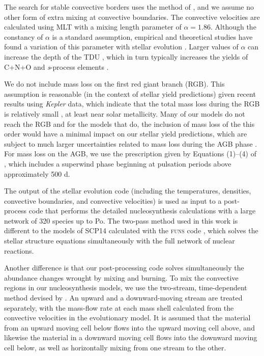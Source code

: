 The search for stable convective borders uses the method of \citet{Lattanzio:1986cz} \citep[see also][]{Frost:1996fu}, and we assume no other form of extra mixing at convective boundaries. The convective velocities are calculated using MLT with a mixing length parameter of $\alpha=1.86$. Although the constancy of $\alpha$ is a standard assumption, empirical and theoretical studies have found a variation of this parameter with stellar evolution \citep{Lebzelter:2007ho,Magic:2014vb}. Larger values of $\alpha$ can increase the depth of the TDU \citep[e.g.,][]{Boothroyd:1988jl}, which in turn typically increases the yields of C+N+O and \textit{s}-process elements \citep{Cristallo:2009kn,Cristallo:2011fz}.

We do not include mass loss on the first red giant branch (RGB). This assumption is reasonable (in the context of stellar yield predictions) given recent results using \textit{Kepler} data, which indicate that the total mass loss during the RGB is relatively small \citep[$\Delta M=0.09\pm 0.03\pm 0.04\ \Msun$;][]{Miglio:2012dm}, at least near solar metallicity. Many of our models do not reach the RGB and for the models that do, the inclusion of mass loss of the this order would have a minimal impact on our stellar yield predictions, which are subject to much larger uncertainties related to mass loss during the AGB phase \citep{Stancliffe:2007er}. For mass loss on the AGB, we use the prescription given by Equations (1)--(4) of \citet{Vassiliadis:1993jk}, which includes a superwind phase beginning at pulsation periods above approximately 500 d.

The output of the stellar evolution code (including the temperatures, densities, convective boundaries, and convective velocities) is used as input to a post-process code that performs the detailed nucleosynthesis calculations with a large network of 320 species up to Po. The two-pass method used in this work is different to the models of SCP14 calculated with the \textsc{funs} code \citep[a descendant of \textsc{franec};][]{Chieffi:1989dp}, which solves the stellar structure equations simultaneously with the full network of nuclear reactions.

Another difference is that our post-processing code solves simultaneously the abundance changes wrought by mixing and burning. To mix the convective regions in our nucleosynthesis models, we use the two-stream, time-dependent method devised by \citet{Cannon:1993te}. An upward and a downward-moving stream are treated separately, with the mass-flow rate at each mass shell calculated from the convective velocities in the evolutionary model. It is assumed that the material from an upward moving cell below flows into the upward moving cell above, and likewise the material in a downward moving cell flows into the downward moving cell below, as well as horizontally mixing from one stream to the other.

